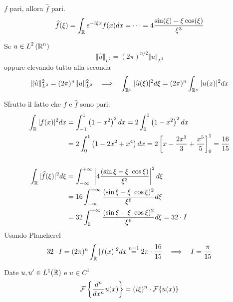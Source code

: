 $f$ pari, allora $\hat{f}$ pari.
\begin{equation*}
\widehat{f}(\xi) = \int_{\mathbb{R}} e^{- i\xi x} f(x) dx = \cdots = 4\frac{\sin(\xi) - \xi \cos(\xi)}{\xi^{3}}
\end{equation*}
\begin{thm}
 Se $\displaystyle u\in L^{2}\left(\mathbb{R}^{n}\right)$
\begin{equation*}
\Vert \hat{u}\Vert_{L^{2}} = (2\pi)^{n/2}\Vert u\Vert_{L^{2}}
\end{equation*}
oppure elevando tutto alla seconda
\begin{equation*}
\Vert \hat{u}\Vert^{2}_{L^{2}} = (2\pi)^{n}\Vert u\Vert^{2}_{L^{2}} \ \ \implies \ \ \int_{\RR^{n}}| \hat{u}(\xi)|^{2} d\xi = (2\pi)^{n}\int_{\RR^{n}}| u(x)|^{2} dx
\end{equation*}
\end{thm}
Sfrutto il fatto che $f$ e $\hat{f}$ sono pari:
\begin{align*}
\int_{\mathbb{R}}| f(x)|^{2} dx & = \int^{1}_{- 1}\left(1 - x^{2}\right)^{2} dx = 2\int^{1}_{0}\left(1 - x^{2}\right)^{2} dx\\
 & = 2\int^{1}_{0}\left(1 - 2x^2 + x^{4}\right) dx = 2\left[ x - \frac{2x^{3}}{3} + \frac{x^{5}}{5}\right]^{1}_{0} = \frac{16}{15}\\
 & \\
\int_{\mathbb{R}}| \widehat{f}(\xi)|^{2} d\xi & = \int^{+ \infty}_{- \infty}\left| 4\frac{(\sin \xi - \xi \ \cos \xi)}{\xi^{3}}\right|^{2} d\xi \\
 & = 16\int^{+ \infty}_{- \infty}\frac{(\sin \xi - \xi \ \cos \xi)^{2}}{\xi^{6}} d\xi \\
 & = 32\int^{+ \infty}_{0}\frac{(\sin \xi - \xi \ \cos \xi)^{2}}{\xi^{6}} d\xi = 32 \cdot I
\end{align*}
Usando Plancherel
\begin{equation*}
32 \cdot I = (2\pi)^{n}\int_{\mathbb{R}}| f(x)|^{2} dx\overset{n = 1}{=} 2\pi \cdot \frac{16}{15} \ \ \implies \ \ I = \frac{\pi}{15}
\end{equation*}
\Soluzione
\begin{thm}
 Date $u, u'\in L^{1}(\mathbb{R})$ e $u\in C^{1}$
\begin{equation*}
\mathcal{F} \left\{\frac{d^{n}}{dx^{n}} u(x)\right\} = (i\xi)^{n} \cdot \mathcal{F} \{u(x)\}
\end{equation*}
\end{thm}
